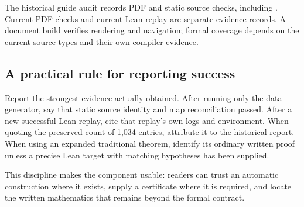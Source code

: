 The historical guide audit records PDF and static source checks, including . Current PDF checks and current Lean replay are separate evidence records. A document build verifies rendering and navigation; formal coverage depends on the current source types and their own compiler evidence.

\subsection{A practical rule for reporting success}

Report the strongest evidence actually obtained. After running only the data generator, say that static source identity and map reconciliation passed. After a new successful Lean replay, cite that replay's own logs and environment. When quoting the preserved count of 1,034 entries, attribute it to the historical report. When using an expanded traditional theorem, identify its ordinary written proof unless a precise Lean target with matching hypotheses has been supplied.

This discipline makes the component usable: readers can trust an automatic construction where it exists, supply a certificate where it is required, and locate the written mathematics that remains beyond the formal contract.
